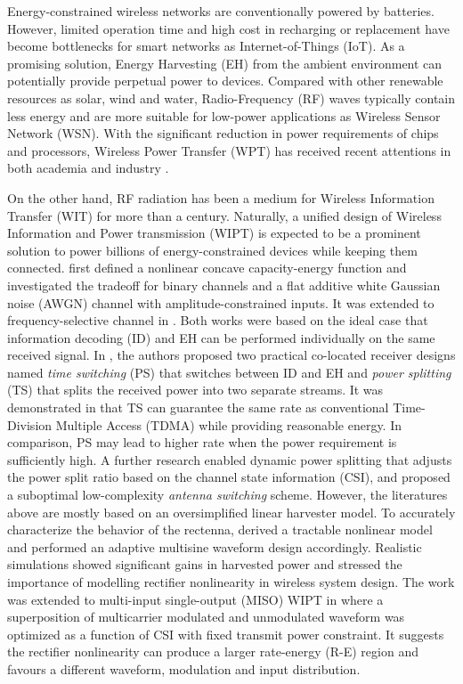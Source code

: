 Energy-constrained wireless networks are conventionally powered by batteries. However, limited operation time and high cost in recharging or replacement have become bottlenecks for smart networks as Internet-of-Things (IoT). As a promising solution, Energy Harvesting (EH) from the ambient environment can potentially provide perpetual power to devices. Compared with other renewable resources as solar, wind and water, Radio-Frequency (RF) waves typically contain less energy and are more suitable for low-power applications as Wireless Sensor Network (WSN). With the significant reduction in power requirements of chips and processors, Wireless Power Transfer (WPT) has received recent attentions in both academia and industry \cite{R.Varshney2008,Grover2010,Zhang2013,Hui2014,Krikidis2014,Valenta2014,Boshkovska2015,Ding2015,Costanzo2016,Clerckx2018a}.

On the other hand, RF radiation has been a medium for Wireless Information Transfer (WIT) for more than a century. Naturally, a unified design of Wireless Information and Power transmission (WIPT) is expected to be a prominent solution to power billions of energy-constrained devices while keeping them connected. \cite{R.Varshney2008} first defined a nonlinear concave capacity-energy function and investigated the tradeoff for binary channels and a flat additive white Gaussian noise (AWGN) channel with amplitude-constrained inputs. It was extended to frequency-selective channel in \cite{Grover2010}. Both works were based on the ideal case that information decoding (ID) and EH can be performed individually on the same received signal. In \cite{Zhang2013}, the authors proposed two practical co-located receiver designs named \textit{time switching} (PS) that switches between ID and EH and \textit{power splitting} (TS) that splits the received power into two separate streams. It was demonstrated in \cite{Zhou2013a} that TS can guarantee the same rate as conventional Time-Division Multiple Access (TDMA) while providing reasonable energy. In comparison, PS may lead to higher rate when the power requirement is sufficiently high. A further research \cite{Liu2013} enabled dynamic power splitting that adjusts the power split ratio based on the channel state information (CSI), and proposed a suboptimal low-complexity \textit{antenna switching} scheme. However, the literatures above are mostly based on an oversimplified linear harvester model. To accurately characterize the behavior of the rectenna, \cite{Clerckx2016} derived a tractable nonlinear model and performed an adaptive multisine waveform design accordingly. Realistic simulations showed significant gains in harvested power and stressed the importance of modelling rectifier nonlinearity in wireless system design. The work was extended to multi-input single-output (MISO) WIPT in \cite{Clerckx2018} where a superposition of multicarrier modulated and unmodulated waveform was optimized as a function of CSI with fixed transmit power constraint. It suggests the rectifier nonlinearity can produce a larger rate-energy (R-E) region and favours a different waveform, modulation and input distribution. 
